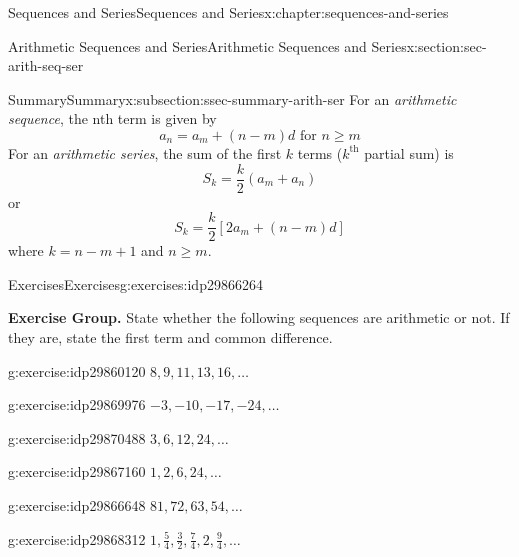 \documentclass[twoside,10pt,]{book}
\numberwithin{equation}{section}
\newcommand{\kth}{{k^{\text{th}}}}
\begin{document}
\begin{chapterptx}{Sequences and Series}{}{Sequences and Series}{}{}{x:chapter:sequences-and-series}
\begin{sectionptx}{Arithmetic Sequences and Series}{}{Arithmetic Sequences and Series}{}{}{x:section:sec-arith-seq-ser}
\begin{subsectionptx}{Summary}{}{Summary}{}{}{x:subsection:ssec-summary-arith-ser}
For an \emph{arithmetic sequence}, the nth term is given by%
\begin{equation*}
a_n = a_m + \left(n - m \right)d \text{   for } n \ge m
\end{equation*}
For an \emph{arithmetic series}, the sum of the first \(k\) terms (\(\kth{}\) partial sum) is%
\begin{equation*}
S_k = \frac{k}{2}\left(a_m + a_n \right)
\end{equation*}
or%
\begin{equation*}
S_k = \frac{k}{2}\left[ 2a_m + \left(n - m \right)d \right]
\end{equation*}
where \(k=n-m+1\) and \(n\ge m\).%
\end{subsectionptx}
%
%
\typeout{************************************************}
\typeout{************************************************}
%
\begin{exercises-subsection}{Exercises}{}{Exercises}{}{}{g:exercises:idp29866264}
\par\medskip\noindent%
\textbf{Exercise Group.}\space\space%
State whether the following sequences are arithmetic or not.  If they are, state the first term and common difference.\begin{exercisegroup}
\begin{divisionexerciseeg}{1}{}{}{g:exercise:idp29860120}%
\(8, 9, 11, 13, 16, \ldots\)\end{divisionexerciseeg}%
\begin{divisionexerciseeg}{2}{}{}{g:exercise:idp29869976}%
\(-3, -10, -17, -24, \ldots\)\end{divisionexerciseeg}%
\begin{divisionexerciseeg}{3}{}{}{g:exercise:idp29870488}%
\(3, 6, 12, 24, \ldots\)\end{divisionexerciseeg}%
\begin{divisionexerciseeg}{4}{}{}{g:exercise:idp29867160}%
\(1, 2, 6, 24, \ldots\)\end{divisionexerciseeg}%
\begin{divisionexerciseeg}{5}{}{}{g:exercise:idp29866648}%
\(81, 72, 63, 54, \ldots\)\end{divisionexerciseeg}%
\begin{divisionexerciseeg}{6}{}{}{g:exercise:idp29868312}%
\(1,\frac{5}{4},\frac{3}{2},\frac{7}{4},2,\frac{9}{4},\ldots\)\end{divisionexerciseeg}%
\end{exercisegroup}
\par\medskip\noindent

\end{exercises-subsection}
\end{sectionptx}
\end{chapterptx}
\end{document}
